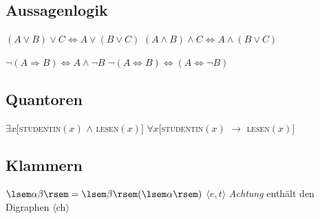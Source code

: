 \documentclass[10pt,paper=a4,abstracton]{scrartcl}
\begin{document}
\subsection{Aussagenlogik}

\eal
\ex $(A \lor B ) \lor C \Leftrightarrow A \lor ( B \lor C)$
\ex $(A \land B ) \land C \Leftrightarrow A \land ( B \lor C)$
\zl

\eal
\ex $\lnot (A \Rightarrow B) \Leftrightarrow A \land \lnot B$ 
\ex $\lnot (A \Leftrightarrow B) \Leftrightarrow (A \Leftrightarrow \lnot B)$ 
\zl 


\subsection{Quantoren}

\eal
\ex $\exists x [$\textsc{studentin}$(x)$ $\land $ \textsc{lesen}$(x)]$
\ex $\forall x [$\textsc{studentin}$(x)$ $\rightarrow $ \textsc{lesen}$(x)]$
\zl 


\subsection{Klammern}
\eal
\ex $\lsem \alpha \beta \rsem = \lsem \beta \rsem (\lsem \alpha \rsem)$
\ex $\langle e, t \rangle$
\ex \emph{Achtung} enthält den Digraphen $\langle$ch$\rangle$
\zl 




%

\end{document}
